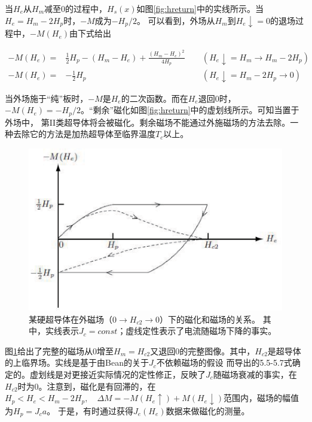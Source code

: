 当$H_e$从$H_m$减至0的过程中，$H_s(x)$如图\ref{fig:hreturn}中的实线所示。当$H_e=H_m-2H_p$时，$-M$成为$-H_p /2$。
可以看到，外场从$H_m$到$H_e\downarrow=0$的退场过程中，$-M(H_e)$由下式给出

\begin{subequations}
\begin{align}
  -M(H_e) =&\frac{1}{2}H_p-(H_m-H_e)+\frac{(H_m-H_e)^2}{4H_p}\
\quad& (H_e\downarrow=H_m\rightarrow H_m-2H_p) \\
-M(H_e) =&-\frac{1}{2}H_p\quad &(H_e\downarrow=H_m-2H_p\rightarrow 0)
\end{align}
\end{subequations}


当外场施于“纯”板时，$-M$是$H_e$的二次函数。而在$H_e$退回0时，$-M(H_e)=-H_p /2$。“剩余”磁化如图\ref{fig:hreturn}中的虚划线所示。可知当置于外场中，
第II类超导体将会被磁化。剩余磁场不能通过外施磁场的方法去除。一种去除它的方法是加热超导体至临界温度$T_c$以上。
\begin{figure}[htbp]
  \centering
 \includegraphics[scale=0.8]{chpt5/figs/fig5.3.eps}
  \caption{某硬超导体在外磁场（$0\rightarrow H_{c2}\rightarrow 0$）下的磁化和磁场的关系。
  其中，实线表示$J_c=const$；虚线定性表示了电流随磁场下降的事实。}\label{fig:magvsh}
\end{figure}
图\ref{fig:magvsh}给出了完整的磁场从0增至$H_m=H_{c2}$又退回0的完整图像。其中，$H_{c2}$是超导体的上临界场。实线是基于由Bean的关于$J_c$不依赖磁场的假设
而导出的5.5-5.7式确定的。虚划线是对更接近实际情况的定性修正，反映了$J_c$随磁场衰减的事实，在$H_{c2}$时为0。注意到，磁化是有回滞的，在
$H_p<H_e<H_m-2H_p,\quad \Delta M=-M(H_e\uparrow)+M(H_e\downarrow)$范围内，磁场的幅值为$H_p=J_c a$。
于是，有时通过获得$J_e(H_e)$数据来做磁化的测量。
